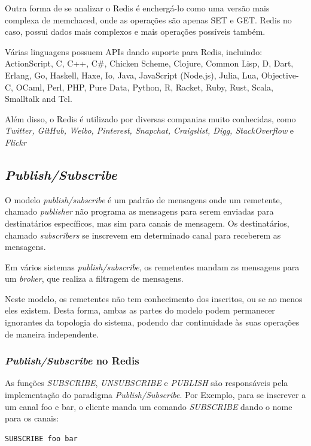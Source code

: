 \documentclass[10pt]{IEEEtran}
\begin{document}
Outra forma de se analizar o Redis é enchergá-lo como uma versão mais complexa de memchaced, onde as operações são apenas SET e GET. Redis no caso, possui dados mais complexos e mais operações possíveis também.

Várias linguagens possuem APIs dando suporte para Redis, incluindo: ActionScript, C, C++, C\#, Chicken Scheme, Clojure, Common Lisp, D, Dart, Erlang, Go, Haskell, Haxe, Io, Java, JavaScript (Node.js), Julia, Lua, Objective-C, OCaml, Perl, PHP, Pure Data, Python, R, Racket, Ruby, Rust, Scala, Smalltalk and Tcl.

Além disso, o Redis é utilizado por diversas companias muito conhecidas, como \textit{Twitter, GitHub, Weibo, Pinterest, Snapchat, Craigslist, Digg, StackOverflow} e \textit{Flickr}

\subsection{\textit{Publish/Subscribe}}

O modelo \textit{publish/subscribe} é um padrão de mensagens onde um remetente, chamado \textit{publisher} não programa as mensagens para serem enviadas para destinatários específicos, mas sim para canais de mensagem. Os destinatários, chamado \textit{subscribers} se inscrevem em determinado canal para receberem as mensagens.

Em vários sistemas \textit{publish/subscribe}, os remetentes mandam as mensagens para um \textit{broker}, que realiza a filtragem de mensagens.

Neste modelo, os remetentes não tem conhecimento dos inscritos, ou se ao menos eles existem. Desta forma, ambas as partes do modelo podem permanecer ignorantes da topologia do sistema, podendo dar continuidade às suas operações de maneira independente.

\subsubsection{\textit{Publish/Subscribe} no Redis}

As funções \textit{SUBSCRIBE}, \textit{UNSUBSCRIBE} e \textit{PUBLISH} são responsáveis pela implementação do paradigma \textit{Publish/Subscribe}. Por Exemplo, para se inscrever a um canal foo e bar, o cliente manda um comando \textit{SUBSCRIBE} dando o nome para os canais:
\begin{lstlisting}
SUBSCRIBE foo bar
\end{lstlisting}
\end{document}

